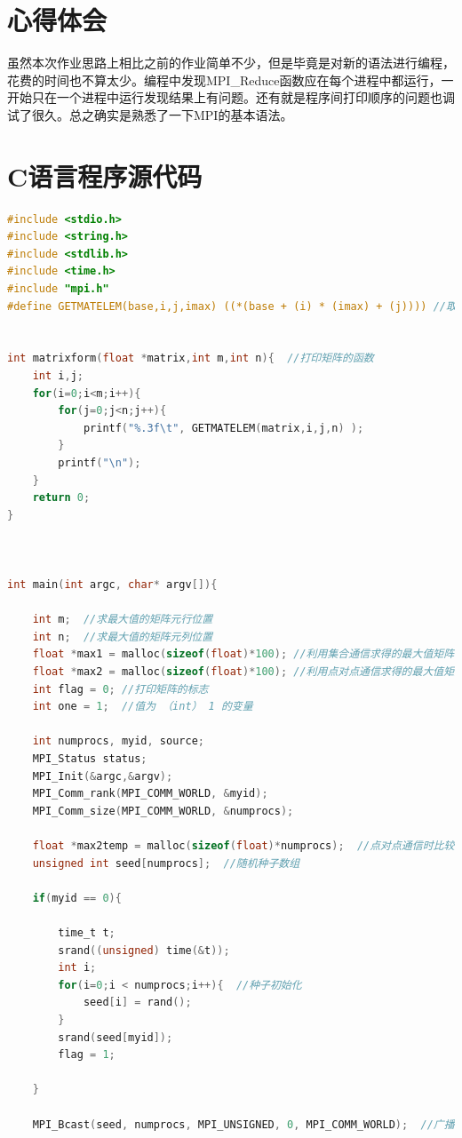 \documentclass[a4paper,11pt]{article}
\begin{document}
\section{心得体会}
虽然本次作业思路上相比之前的作业简单不少，但是毕竟是对新的语法进行编程，花费的时间也不算太少。编程中发现MPI\_Reduce函数应在每个进程中都运行，一开始只在一个进程中运行发现结果上有问题。还有就是程序间打印顺序的问题也调试了很久。总之确实是熟悉了一下MPI的基本语法。

\section{C语言程序源代码}
\begin{lstlisting}[language = C]
#include <stdio.h>
#include <string.h>
#include <stdlib.h>
#include <time.h>
#include "mpi.h"
#define GETMATELEM(base,i,j,imax) ((*(base + (i) * (imax) + (j)))) //取二维数组元素


int matrixform(float *matrix,int m,int n){  //打印矩阵的函数
    int i,j;
    for(i=0;i<m;i++){
        for(j=0;j<n;j++){
            printf("%.3f\t", GETMATELEM(matrix,i,j,n) );
        }
        printf("\n");
    }
    return 0;
}



int main(int argc, char* argv[]){
    
    int m;  //求最大值的矩阵元行位置
    int n;  //求最大值的矩阵元列位置
    float *max1 = malloc(sizeof(float)*100); //利用集合通信求得的最大值矩阵
    float *max2 = malloc(sizeof(float)*100); //利用点对点通信求得的最大值矩阵
    int flag = 0; //打印矩阵的标志
    int one = 1;  //值为 （int） 1 的变量
    
    int numprocs, myid, source;
    MPI_Status status;
    MPI_Init(&argc,&argv);
    MPI_Comm_rank(MPI_COMM_WORLD, &myid);
    MPI_Comm_size(MPI_COMM_WORLD, &numprocs);
    
    float *max2temp = malloc(sizeof(float)*numprocs);  //点对点通信时比较大小所用的临时数组
    unsigned int seed[numprocs];  //随机种子数组
    
    if(myid == 0){
        
        time_t t;
        srand((unsigned) time(&t));
        int i;
        for(i=0;i < numprocs;i++){  //种子初始化
            seed[i] = rand();
        }
        srand(seed[myid]);
        flag = 1;
        
    }
    
    MPI_Bcast(seed, numprocs, MPI_UNSIGNED, 0, MPI_COMM_WORLD);  //广播主进程求得的随机种子数组
   

\end{lstlisting}
\end{document}
